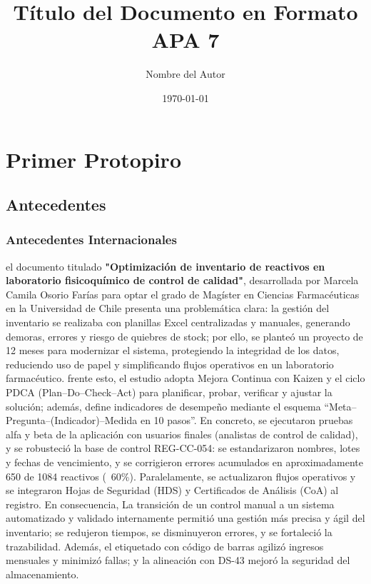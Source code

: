 \documentclass[12pt]{article} %
\title{Título del Documento en Formato APA 7}
\author{Nombre del Autor}
\date{\today}
\begin{document}
\imprimircaratula
\newpage

\section*{Primer Protopiro}

\subsection{Antecedentes}

\subsubsection{Antecedentes Internacionales}

el documento titulado  \textbf{\string"Optimización de inventario de reactivos en laboratorio fisicoquímico de control de calidad"}, desarrollada por Marcela Camila Osorio Farías para optar el grado de Magíster en Ciencias Farmacéuticas en la Universidad de Chile presenta una problemática clara: la gestión del inventario se realizaba con planillas Excel centralizadas y manuales, generando demoras, errores y riesgo de quiebres de stock; por ello, se planteó un proyecto de 12 meses para modernizar el sistema, protegiendo la integridad de los datos, reduciendo uso de papel y simplificando flujos operativos en un laboratorio farmacéutico. frente esto, el estudio adopta Mejora Continua con Kaizen y el ciclo PDCA (Plan–Do–Check–Act) para planificar, probar, verificar y ajustar la solución; además, define indicadores de desempeño mediante el esquema “Meta–Pregunta–(Indicador)–Medida en 10 pasos”. En concreto, se ejecutaron pruebas alfa y beta de la aplicación con usuarios finales (analistas de control de calidad), y se robusteció la base de control REG-CC-054: se estandarizaron nombres, lotes y fechas de vencimiento, y se corrigieron errores acumulados en aproximadamente 650 de 1084 reactivos (~60\%). Paralelamente, se actualizaron flujos operativos y se integraron Hojas de Seguridad (HDS) y Certificados de Análisis (CoA) al registro. En consecuencia, La transición de un control manual a un sistema automatizado y validado internamente permitió una gestión más precisa y ágil del inventario; se redujeron tiempos, se disminuyeron errores, y se fortaleció la trazabilidad. Además, el etiquetado con código de barras agilizó ingresos mensuales y minimizó fallas; y la alineación con DS-43 mejoró la seguridad del almacenamiento.
\end{document}
